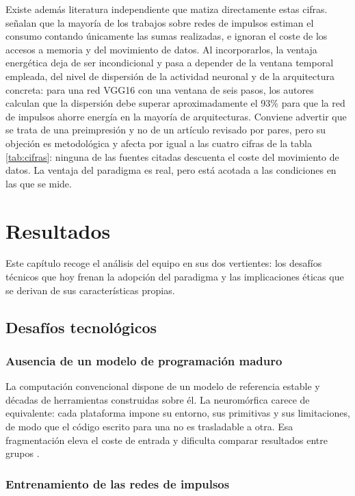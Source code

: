 \documentclass[a4paper,11pt,oneside]{book}
\begin{document}
Existe además literatura independiente que matiza directamente estas cifras.
\textcite{yan2024} señalan que la mayoría de los trabajos sobre redes de
impulsos estiman el consumo contando únicamente las sumas realizadas, e ignoran
el coste de los accesos a memoria y del movimiento de datos. Al incorporarlos,
la ventaja energética deja de ser incondicional y pasa a depender de la ventana
temporal empleada, del nivel de dispersión de la actividad neuronal y de la
arquitectura concreta: para una red VGG16 con una ventana de seis pasos, los
autores calculan que la dispersión debe superar aproximadamente el 93\% para que
la red de impulsos ahorre energía en la mayoría de arquitecturas. Conviene
advertir que se trata de una preimpresión y no de un artículo revisado por
pares, pero su objeción es metodológica y afecta por igual a las cuatro cifras
de la tabla \ref{tab:cifras}: ninguna de las fuentes citadas descuenta el coste
del movimiento de datos. La ventaja del paradigma es real, pero está acotada a
las condiciones en las que se mide.

\chapter{Resultados}
\label{cap:resultados}

Este capítulo recoge el análisis del equipo en sus dos vertientes: los desafíos
técnicos que hoy frenan la adopción del paradigma y las implicaciones éticas que
se derivan de sus características propias.

\section{Desafíos tecnológicos}
\label{sec:desafios}

\subsection{Ausencia de un modelo de programación maduro}

La computación convencional dispone de un modelo de referencia estable y décadas
de herramientas construidas sobre él. La neuromórfica carece de equivalente: cada
plataforma impone su entorno, sus primitivas y sus limitaciones, de modo que el
código escrito para una no es trasladable a otra. Esa fragmentación eleva el
coste de entrada y dificulta comparar resultados entre grupos
\parencite{schuman2022}.

\subsection{Entrenamiento de las redes de impulsos}
\end{document}

